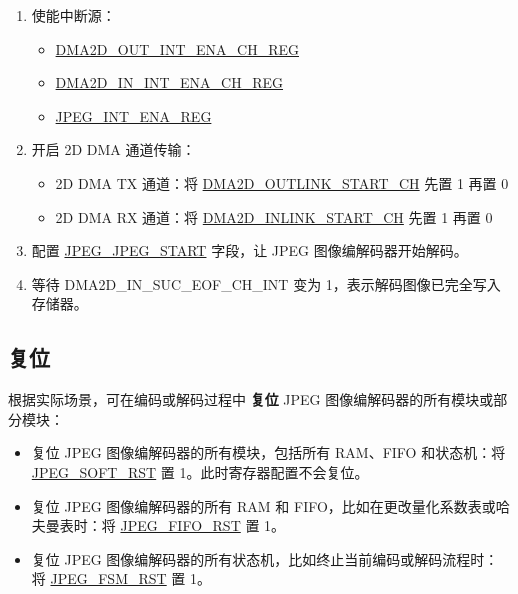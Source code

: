 \documentclass[main\_\_CN.tex]{subfiles}
\begin{document}
\begin{enumerate}
\begin{enumerate}
\begin{itemize}
            \item 2D DMA TX 通道：\hyperref[fielddesc:DMA2DOUTLINKADDRCHN]{DMA2D\_OUTLINK\_ADDR\_CH}
            \item 2D DMA RX 通道：\hyperref[fielddesc:DMA2DINLINKADDRCHN]{DMA2D\_INLINK\_ADDR\_CH}
        \end{itemize}
    \end{enumerate}
    \item 使能中断源：
    \begin{itemize}
        \item \hyperref[regdesc:DMA2DOUTINTENACHNREG]{DMA2D\_OUT\_INT\_ENA\_CH\_REG}
        \item \hyperref[regdesc:DMA2DININTENACHNREG]{DMA2D\_IN\_INT\_ENA\_CH\_REG}
        \item \hyperref[regdesc:JPEGINTENAREG]{JPEG\_INT\_ENA\_REG}
    \end{itemize}
    \item 开启 2D DMA 通道传输：
    \begin{itemize}
        \item 2D DMA TX 通道：将 \hyperref[fielddesc:DMA2DOUTLINKSTARTCHN]{DMA2D\_OUTLINK\_START\_CH} 先置 1 再置 0
        \item 2D DMA RX 通道：将 \hyperref[fielddesc:DMA2DINLINKSTARTCHN]{DMA2D\_INLINK\_START\_CH} 先置 1 再置 0
    \end{itemize}
    \item 配置 \hyperref[fielddesc:JPEGJPEGSTART]{JPEG\_JPEG\_START} 字段，让 JPEG 图像编解码器开始解码。
    \item 等待 DMA2D\_IN\_SUC\_EOF\_CH\_INT 变为 1，表示解码图像已完全写入存储器。
\end{enumerate}

\subsection{复位}
根据实际场景，可在编码或解码过程中 \textbf{复位} JPEG 图像编解码器的所有模块或部分模块：
\begin{itemize}
    \item 复位 JPEG 图像编解码器的所有模块，包括所有 RAM、FIFO 和状态机：将 \hyperref[fielddesc:JPEGSOFTRST]{JPEG\_SOFT\_RST} 置 1。此时寄存器配置不会复位。
    \item 复位 JPEG 图像编解码器的所有 RAM 和 FIFO，比如在更改量化系数表或哈夫曼表时：将 \hyperref[fielddesc:JPEGFIFORST]{JPEG\_FIFO\_RST} 置 1。
    \item 复位 JPEG 图像编解码器的所有状态机，比如终止当前编码或解码流程时：将 \hyperref[fielddesc:JPEGFSMRST]{JPEG\_FSM\_RST} 置 1。
\end{itemize}
\end{document}
